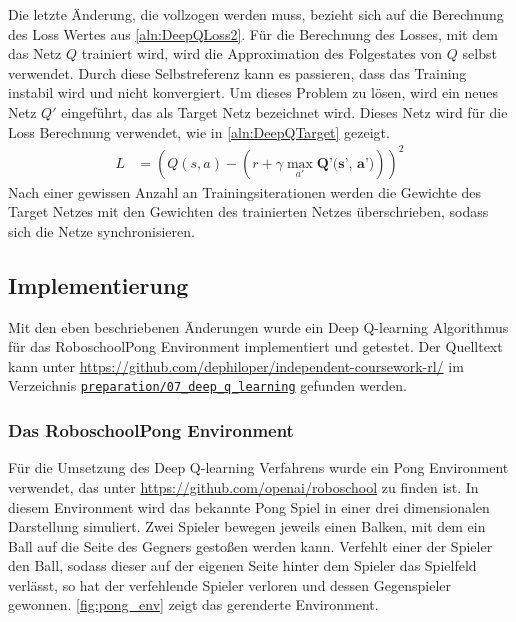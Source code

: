 \documentclass[11pt]{scrartcl}
\begin{document}
Die letzte Änderung, die vollzogen werden muss, bezieht sich auf die Berechnung des Loss
Wertes aus \autoref{aln:DeepQLoss2}. Für die Berechnung des Losses, mit dem das Netz $Q$
trainiert wird, wird die Approximation des Folgestates von $Q$ selbst verwendet. Durch
diese Selbstreferenz kann es passieren, dass das Training instabil wird und nicht
konvergiert. Um dieses Problem zu lösen, wird ein neues Netz $Q'$ eingeführt, das als
Target Netz bezeichnet wird. Dieses Netz wird für die Loss Berechnung verwendet, wie in
\autoref{aln:DeepQTarget} gezeigt.
\begin{align}
  L & = \left(Q(s, a) - \left(r + \gamma \max_{a'} \textbf{Q'(s', a')}\right)\right)^2
  \label{aln:DeepQTarget}
\end{align}
\noindent
Nach einer gewissen Anzahl an Trainingsiterationen werden die Gewichte des Target Netzes
mit den Gewichten des trainierten Netzes überschrieben, sodass sich die Netze
synchronisieren.

\subsection{Implementierung}
Mit den eben beschriebenen Änderungen wurde ein Deep Q-learning Algorithmus für das
RoboschoolPong Environment implementiert und getestet. Der Quelltext kann unter
\url{https://github.com/dephiloper/independent-coursework-rl/} im Verzeichnis
\href{https://github.com/dephiloper/independent-coursework-rl/tree/master/preparation/07_deep_q_learning}
{\nolinkurl{preparation/07\_deep\_q\_learning}} gefunden werden.


\subsubsection{Das RoboschoolPong Environment}
Für die Umsetzung des Deep Q-learning Verfahrens wurde ein Pong Environment verwendet, das
unter \url{https://github.com/openai/roboschool} zu finden ist. In diesem Environment wird
das bekannte Pong Spiel in einer drei dimensionalen Darstellung simuliert. Zwei Spieler
bewegen jeweils einen Balken, mit dem ein Ball auf die Seite des Gegners gestoßen werden
kann. Verfehlt einer der Spieler den Ball, sodass dieser auf der eigenen Seite hinter dem
Spieler das Spielfeld verlässt, so hat der verfehlende Spieler verloren und dessen
Gegenspieler gewonnen. \autoref{fig:pong_env} zeigt das gerenderte Environment.
\end{document}
